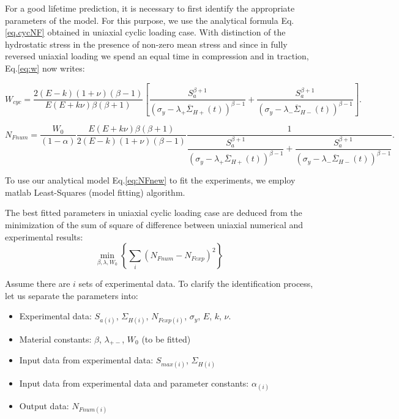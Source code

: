 For a good lifetime prediction, it is necessary to first identify the appropriate parameters of the model. For this purpose, we use the analytical formula Eq.\eqref{eq.cycNF} obtained in uniaxial cyclic loading case. With distinction of the hydrostatic stress in the presence of non-zero mean stress and since in fully reversed uniaxial loading we spend an equal time in compression and in traction, Eq.\eqref{eq:w} now writes:

\begin{equation}
W_{cyc}=\dfrac{2(E-k)(1+\nu)\left( \beta-1\right) }{ E(E+k\nu)\beta\left( \beta+1\right) }\left[ \dfrac{S_{a}^{\beta+1}}{ \left(\sigma_y-\lambda_+ \overline{\Sigma}_{H+}(t)\right)^{\beta-1}}+\dfrac{S_{a}^{\beta+1}}{ \left(\sigma_y-\lambda_- \overline{\Sigma}_{H-}(t)\right)^{\beta-1}}\right] .
\label{eq:wcycnew}
\end{equation}

\begin{equation}N_{Fnum}=\dfrac{W_0}{\left( 1-\alpha\right) }\dfrac{E(E+k\nu)\beta\left( \beta+1\right) }{ 2(E-k)(1+\nu)\left( \beta-1\right) }\dfrac{1}{\dfrac{S_{a}^{\beta+1}}{\left(\sigma_y-\lambda_+\overline{\Sigma}_{H+}(t)\right)^{\beta-1}}+\dfrac{S_{a}^{\beta+1}}{\left(\sigma_y-\lambda_-\overline{\Sigma}_{H-}(t)\right)^{\beta-1}}}.\label{eq:NFnew}
\end{equation}


To use our analytical model Eq.\eqref{eq:NFnew} to fit the experiments, we employ matlab Least-Squares (model fitting) algorithm. 

The best fitted parameters in uniaxial cyclic loading case are deduced from the minimization of the sum of square of difference between uniaxial numerical and experimental results:
\begin{equation}
\min_{\beta,\lambda,W_0}\left\lbrace \sum_{i}\left(N_{Fnum}-N_{Fexp} \right)^2\right\rbrace 
\label{eq.leastsquares}
\end{equation}

Assume there are $i$ sets of experimental data. To clarify the identification process, let us separate the parameters into:
\begin{itemize}
	\item Experimental data: $S_{a(i)}$, $\Sigma_{H(i)}$, $N_{Fexp(i)}$, $\sigma_y$, $E$, $k$, $\nu$.
	\item Material constants: $\beta$, $\lambda_{+-}$, $W_0$ (to be fitted)
	\item Input data from experimental data: $S_{max(i)}$, $\Sigma_{H(i)}$
	\item Input data from experimental data and parameter constants: $\alpha_{(i)}$
	\item Output data: $N_{Fnum(i)}$
\end{itemize}

